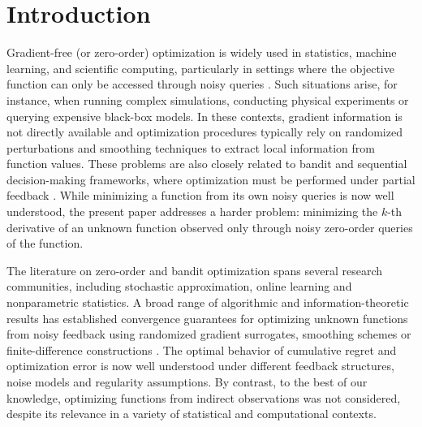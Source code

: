 \documentclass{article}
\theoremstyle{definition}
\begin{document}
\section{Introduction}
\label{sec:intro}

Gradient-free (or zero-order) optimization is widely used in statistics, machine learning, and scientific computing, particularly in settings where the objective function can only be accessed through noisy queries \citep{conn2009introduction,spall2002multivariate}. Such situations arise, for instance, when running complex simulations, conducting physical 
experiments or querying expensive black-box models. In these contexts, gradient information is not directly available and optimization procedures typically rely on randomized perturbations and smoothing techniques to extract local information from function values. 
These problems are also closely related to bandit and sequential decision-making frameworks, where optimization must be performed under partial feedback \citep{flaxman2004online,hazan2014bandit,shamir2017optimal}. While minimizing a function from its own noisy queries is now well understood, 
the present paper addresses a harder problem: minimizing the $k$-th derivative of an unknown function observed only through noisy zero-order queries of the function.

The literature on zero-order and bandit optimization spans several research communities, including stochastic approximation, online learning and 
nonparametric statistics. A broad range of algorithmic and information-theoretic results has established convergence guarantees for optimizing unknown functions from noisy feedback using 
randomized gradient surrogates, smoothing schemes or finite-difference constructions 
\citep{kiefer1952stochastic, polyak1990optimal, dippon2003accelerated, agarwal2010optimal,ghadimi2013stochastic,shamir2013complexity, duchi2015optimal,
bach2016highly,nesterov2017random,shamir2017optimal,locatelli2018adaptivity,akhavan2020exploiting,akhavan2021distributed,akhavan2024estimating,akhavan2024gradient}. The optimal behavior of cumulative regret and optimization error is now well understood under different feedback structures, noise models and regularity assumptions. By contrast, to the best of our knowledge, optimizing functions from indirect observations was not considered, despite its relevance in a variety of statistical 
and computational contexts.
\end{document}
